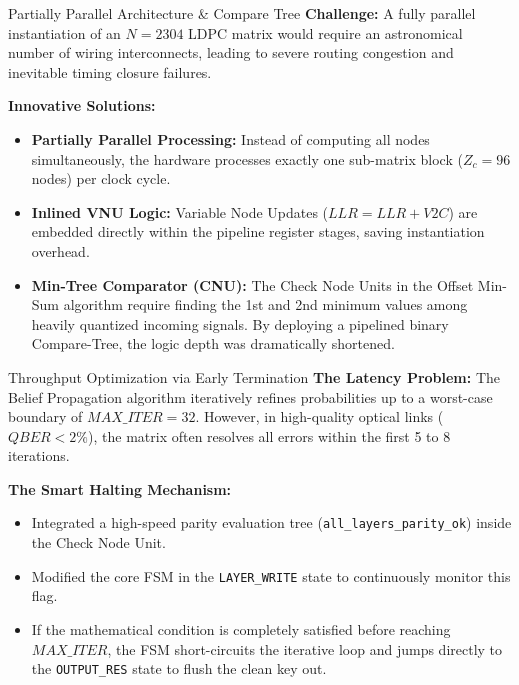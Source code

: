 \documentclass[t, aspectratio=169]{beamer}
\begin{document}
	\begin{frame}{Partially Parallel Architecture \& Compare Tree}
		\textbf{Challenge:} A fully parallel instantiation of an $N=2304$ LDPC matrix would require an astronomical number of wiring interconnects, leading to severe routing congestion and inevitable timing closure failures.
		
		\vspace{1em}
		\textbf{Innovative Solutions:}
		\begin{itemize}
			\item \textbf{Partially Parallel Processing:} Instead of computing all nodes simultaneously, the hardware processes exactly one sub-matrix block ($Z_c = 96$ nodes) per clock cycle.
            \item \textbf{Inlined VNU Logic:} Variable Node Updates ($LLR = LLR + V2C$) are embedded directly within the pipeline register stages, saving instantiation overhead.
			\item \textbf{Min-Tree Comparator (CNU):} The Check Node Units in the Offset Min-Sum algorithm require finding the 1st and 2nd minimum values among heavily quantized incoming signals. By deploying a pipelined binary Compare-Tree, the logic depth was dramatically shortened.
		\end{itemize}
	\end{frame}

	\begin{frame}{Throughput Optimization via Early Termination}
		\textbf{The Latency Problem:} The Belief Propagation algorithm iteratively refines probabilities up to a worst-case boundary of $MAX\_ITER = 32$. However, in high-quality optical links ($QBER < 2\%$), the matrix often resolves all errors within the first 5 to 8 iterations.
		
		\vspace{1em}
		\textbf{The Smart Halting Mechanism:}
		\begin{itemize}
			\item Integrated a high-speed parity evaluation tree (\texttt{all\_layers\_parity\_ok}) inside the Check Node Unit.
			\item Modified the core FSM in the \texttt{LAYER\_WRITE} state to continuously monitor this flag.
			\item If the mathematical condition is completely satisfied before reaching $MAX\_ITER$, the FSM short-circuits the iterative loop and jumps directly to the \texttt{OUTPUT\_RES} state to flush the clean key out.
		\end{itemize}
	\end{frame}
\end{document}
